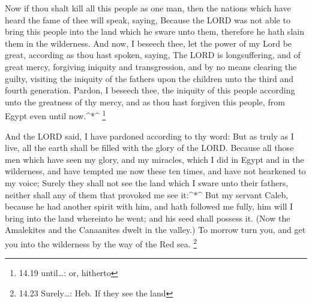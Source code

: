  Now if thou shalt kill all this people as one man, then
the nations which have heard the fame of thee will speak, saying,
 Because the LORD was not able to bring this people into
the land which he sware unto them, therefore he hath slain them in the
wilderness.  And now, I beseech thee, let the power of my
Lord be great, according as thou hast spoken, saying,  The
LORD is longsuffering, and of great mercy, forgiving iniquity and
transgression, and by no means clearing the guilty, visiting the
iniquity of the fathers upon the children unto the third and fourth
generation.  Pardon, I beseech thee, the iniquity of this
people according unto the greatness of thy mercy, and as thou hast
forgiven this people, from Egypt even until now.\^{}*\^{} \footnote{14.19
  until\ldots: or, hitherto}

 And the LORD said, I have pardoned according to thy word:
 But as truly as I live, all the earth shall be filled with
the glory of the LORD.  Because all those men which have
seen my glory, and my miracles, which I did in Egypt and in the
wilderness, and have tempted me now these ten times, and have not
hearkened to my voice;  Surely they shall not see the land
which I sware unto their fathers, neither shall any of them that
provoked me see it:\^{}*\^{}  But my servant Caleb, because
he had another spirit with him, and hath followed me fully, him will I
bring into the land whereinto he went; and his seed shall possess it.
 (Now the Amalekites and the Canaanites dwelt in the
valley.) To morrow turn you, and get you into the wilderness by the way
of the Red sea. \footnote{14.23 Surely\ldots: Heb. If they see the land}


